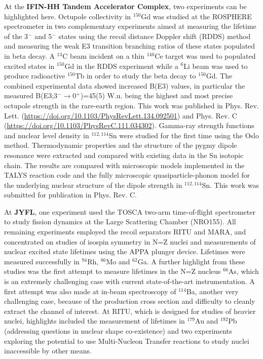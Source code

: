 At the \textbf{IFIN-HH Tandem Accelerator Complex}, two experiments can be highlighted here. 
Octupole collectivity in $^{150}$Gd was studied at the ROSPHERE spectrometer in two complementary experiments aimed at measuring the lifetime of the 3$^-$ and 5$^-$ states using the recoil distance Doppler shift (RDDS) method and measuring the weak E3 transition branching ratios of these states populated in beta decay. A $^{13}$C beam incident on a thin $^{140}$Ce target was used to populated excited states in $^{150}$Gd in the RDDS experiment while a $^6$Li beam was used to produce radioactive $^{150}$Tb in order to study the beta decay to $^{150}$Gd. The combined experimental data showed increased B(E3) values, in particular the measured B(E3;3$^-$$\rightarrow$0$^+$)=45(5) W.u. being the highest and most precise octupole strength in the rare-earth region. This work 
was published in Phys. Rev. Lett. (\url{https://doi.org/10.1103/PhysRevLett.134.092501}) and Phys. Rev. C (\url{https://doi.org/10.1103/PhysRevC.111.034302}).
Gamma-ray strength functions and nuclear level density in $^{112,114}$Sn were studied for the first time using the Oslo method. Thermodynamic properties and the structure of the pygmy dipole resonance were extracted and compared with existing data in the Sn isotopic chain. The results are compared with microscopic models implemented in the TALYS reaction code and the fully microscopic quasiparticle-phonon model for the underlying nuclear structure of the dipole strength in $^{112,114}$Sn. This work was submitted for publication in Phys. Rev. C. 

At \textbf{JYFL}, one experiment used the TOSCA two-arm time-of-flight spectrometer to study fission dynamics at the Large Scattering Chamber (NRO155). All remaining experiments employed the recoil separators RITU and MARA, and concentrated on studies of isospin symmetry in N=Z nuclei and measurements of nuclear excited state lifetimes using the APPA plunger device. Lifetimes were measured successfully in $^{94}$Rh, $^{86}$Mo and $^{62}$Ga. A further highlight from these studies was the first attempt to measure lifetimes in the N=Z nucleus $^{66}$As, which is an extremely challenging case with current state-of-the-art instrumentation. A first attempt was also made at in-beam spectroscopy of $^{114}$Ba, another very challenging case, because of the production cross section and difficulty to cleanly extract the channel of interest. At RITU, which is designed for studies of heavier nuclei, highlights included the measurement of lifetimes in $^{179}$Au and $^{192}$Pb (addressing questions in nuclear shape co-existence) and two experiments exploring the potential to use Multi-Nucleon Transfer reactions to study nuclei inaccessible by other means.


